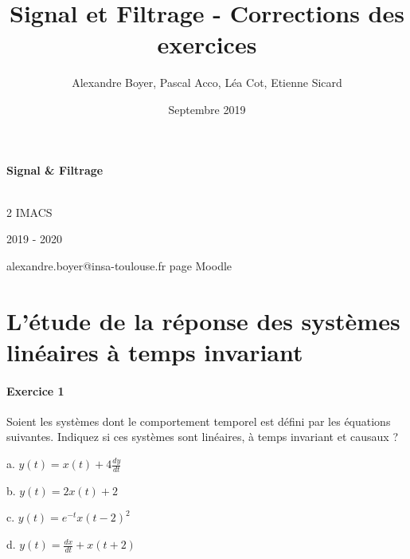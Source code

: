 \documentclass[11pt]{report}
\title{{\huge Signal et Filtrage - Corrections des exercices}}
\author{Alexandre Boyer, Pascal Acco, Léa Cot, Etienne Sicard}
\date{Septembre 2019}
\begin{document}
	\maketitle
	
	\textbf{Signal \& Filtrage}
	
	\textbf{}\\
	
	2 IMACS
	
	2019 - 2020
	
	alexandre.boyer@insa-toulouse.fr	
	page Moodle
	
	
\chapter{}

\newpage


\chapter{L'étude de la réponse des systèmes linéaires à temps invariant}

	\subsubsection{Exercice 1} 
	Soient les systèmes dont le comportement temporel est défini par les équations suivantes. Indiquez si ces systèmes sont linéaires, à temps invariant et causaux ?
	
	a. $y(t) = x(t)+4\frac{dy}{dt}$ 
	
	b. $y(t) = 2x(t)+2$ 
	
	c. $y(t)=e^{-t}x(t-2)^{2}$
	
	d. $y(t)=\frac{dx}{dt}+x(t+2)$
	
	\vspace{1\baselineskip}
	

	
	
\end{document}

